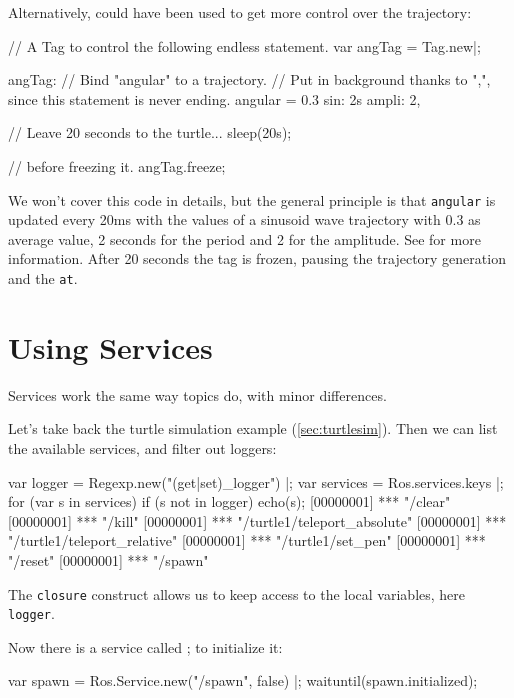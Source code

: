 \bigskip

Alternatively,  could have been used to get more
control over the trajectory:

\begin{urbiunchecked}
// A Tag to control the following endless statement.
var angTag = Tag.new|;

angTag:
  // Bind "angular" to a trajectory.
  // Put in background thanks to ",", since this statement is never ending.
  angular = 0.3 sin: 2s ampli: 2,

// Leave 20 seconds to the turtle...
sleep(20s);

// before freezing it.
angTag.freeze;
\end{urbiunchecked}

We won't cover this code in details, but the general principle is that
\lstinline{angular} is updated every 20ms with the values of a sinusoid wave
trajectory with 0.3 as average value, 2 seconds for the period and 2 for the
amplitude.  See  for more information.  After
20 seconds the tag is frozen, pausing the trajectory generation and the
\lstinline{at}.



\section{Using Services}

Services work the same way topics do, with minor differences.

Let's take back the turtle simulation example (\autoref{sec:turtlesim}).
Then we can list the available services, and filter out loggers:

\begin{urbiunchecked}
var logger = Regexp.new("(get|set)_logger") |;
var services = Ros.services.keys |;
for (var s in services)
  if (s not in logger)
    echo(s);
[00000001] *** "/clear"
[00000001] *** "/kill"
[00000001] *** "/turtle1/teleport_absolute"
[00000001] *** "/turtle1/teleport_relative"
[00000001] *** "/turtle1/set_pen"
[00000001] *** "/reset"
[00000001] *** "/spawn"
\end{urbiunchecked}

The \lstinline{closure} construct allows us to keep access to the local
variables, here \lstinline{logger}.

Now there is a service called ; to initialize it:

\begin{urbiunchecked}
var spawn = Ros.Service.new("/spawn", false) |;
waituntil(spawn.initialized);
\end{urbiunchecked}

